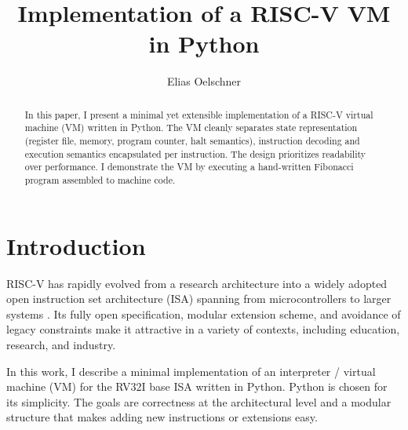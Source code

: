 \documentclass[sigconf]{acmart}
\begin{document}
\title{Implementation of a RISC-V VM in Python}

\author{Elias Oelschner}

\renewcommand{\shortauthors}{Oelschner}

\begin{abstract}
In this paper, I present a minimal yet extensible implementation of a RISC-V virtual machine (VM) written in Python. The VM cleanly separates state representation (register file, memory, program counter, halt semantics), instruction decoding and execution semantics encapsulated per instruction. The design prioritizes readability over performance. I demonstrate the VM by executing a hand-written Fibonacci program assembled to machine code.
\end{abstract}

\maketitle

\section{Introduction}
RISC-V has rapidly evolved from a research architecture into a widely adopted open instruction set architecture (ISA) spanning from microcontrollers to larger systems \cite{riscv-spec}. Its fully open specification, modular extension scheme, and avoidance of legacy constraints make it attractive in a variety of contexts, including education, research, and industry.

In this work, I describe a minimal implementation of an interpreter / virtual machine (VM) for the RV32I base ISA written in Python. Python is chosen for its simplicity. The goals are correctness at the architectural level and a modular structure that makes adding new instructions or extensions easy.
\end{document}
